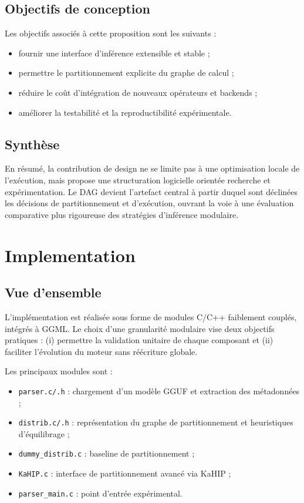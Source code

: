 \documentclass[11pt,a4paper]{article}
\begin{document}
\subsection{Objectifs de conception}

Les objectifs associ\'es \`a cette proposition sont les suivants :

\begin{itemize}[leftmargin=*]
	\item fournir une interface d'inf\'erence extensible et stable ;
	\item permettre le partitionnement explicite du graphe de calcul ;
	\item r\'eduire le co\^ut d'int\'egration de nouveaux op\'erateurs et backends ;
	\item am\'eliorer la testabilit\'e et la reproductibilit\'e exp\'erimentale.
\end{itemize}

\subsection{Synth\`ese}

En r\'esum\'e, la contribution de design ne se limite pas \`a une optimisation locale de l'ex\'ecution, mais propose une structuration logicielle orient\'ee recherche et exp\'erimentation. Le DAG devient l'artefact central \`a partir duquel sont d\'eclin\'ees les d\'ecisions de partitionnement et d'ex\'ecution, ouvrant la voie \`a une \'evaluation comparative plus rigoureuse des strat\'egies d'inf\'erence modulaire.

\section{Implementation}

\subsection{Vue d'ensemble}

L'impl\'ementation est r\'ealis\'ee sous forme de modules C/C++ faiblement coupl\'es, int\'egr\'es \`a GGML. Le choix d'une granularit\'e modulaire vise deux objectifs pratiques : (i) permettre la validation unitaire de chaque composant et (ii) faciliter l'\'evolution du moteur sans r\'e\'ecriture globale.

Les principaux modules sont :
\begin{itemize}[leftmargin=*]
	\item \texttt{parser.c/.h} : chargement d'un mod\`ele GGUF et extraction des m\'etadonn\'ees ;
	\item \texttt{distrib.c/.h} : repr\'esentation du graphe de partitionnement et heuristiques d'\'equilibrage ;
	\item \texttt{dummy\_distrib.c} : baseline de partitionnement ;
	\item \texttt{KaHIP.c} : interface de partitionnement avanc\'e via KaHIP ;
	\item \texttt{parser\_main.c} : point d'entr\'ee exp\'erimental.
\end{itemize}
\end{document}
